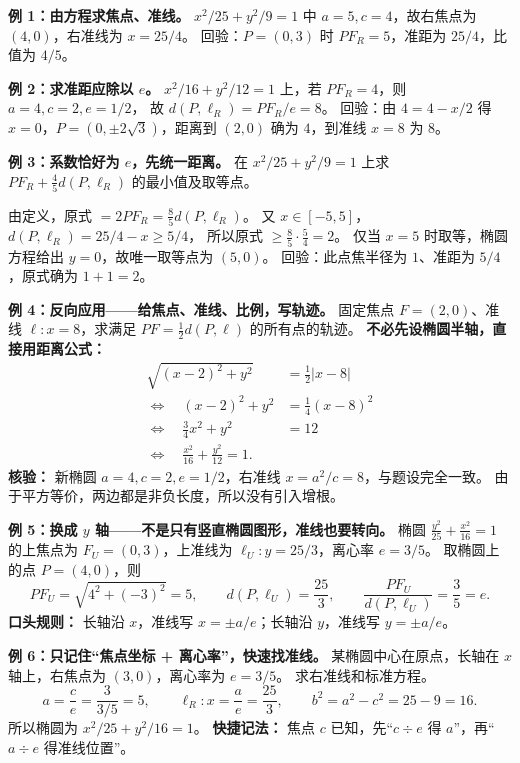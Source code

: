 \begin{examplebox}
\textbf{例 1：由方程求焦点、准线。}
$x^2/25+y^2/9=1$ 中 $a=5,c=4$，故右焦点为 $\boxed{(4,0)}$，右准线为 $\boxed{x=25/4}$。
回验：$P=(0,3)$ 时 $PF_R=5$，准距为 $25/4$，比值为 $4/5$。

\medskip
\textbf{例 2：求准距应除以 $e$。}
$x^2/16+y^2/12=1$ 上，若 $PF_R=4$，则 $a=4,c=2,e=1/2$，
故 $d(P,\ell_R)=PF_R/e=\boxed{8}$。
回验：由 $4=4-x/2$ 得 $x=0$，$P=(0,\pm2\sqrt3)$，距离到 $(2,0)$ 确为 $4$，到准线 $x=8$ 为 $8$。
\end{examplebox}
\clearpage
\begin{examplebox}
\textbf{例 3：系数恰好为 $e$，先统一距离。}
在 $x^2/25+y^2/9=1$ 上求 $PF_R+\tfrac45d(P,\ell_R)$ 的最小值及取等点。

由定义，原式 $=2PF_R=\tfrac85d(P,\ell_R)$。
又 $x\in[-5,5]$，$d(P,\ell_R)=25/4-x\ge5/4$，
所以原式 $\ge\tfrac85\cdot\tfrac54=\boxed{2}$。
仅当 $x=5$ 时取等，椭圆方程给出 $y=0$，故唯一取等点为 $\boxed{(5,0)}$。
回验：此点焦半径为 $1$、准距为 $5/4$，原式确为 $1+1=2$。
\end{examplebox}
\clearpage

\begin{examplebox}
\textbf{例 4：反向应用——给焦点、准线、比例，写轨迹。}
固定焦点 $F=(2,0)$、准线 $\ell:x=8$，求满足
$PF=\tfrac12 d(P,\ell)$ 的所有点的轨迹。
\textbf{不必先设椭圆半轴，直接用距离公式：}
\[
\begin{aligned}
\sqrt{(x-2)^2+y^2}&=\frac12|x-8|\\
\Longleftrightarrow\quad (x-2)^2+y^2&=\frac14(x-8)^2\\
\Longleftrightarrow\quad \frac34 x^2+y^2&=12\\
\Longleftrightarrow\quad \boxed{\frac{x^2}{16}+\frac{y^2}{12}=1}.
\end{aligned}
\]
\textbf{核验：} 新椭圆 $a=4,c=2,e=1/2$，右准线 $x=a^2/c=8$，与题设完全一致。
由于平方等价，两边都是非负长度，所以没有引入增根。
\end{examplebox}
\clearpage
\begin{examplebox}
\textbf{例 5：换成 $y$ 轴——不是只有竖直椭圆图形，准线也要转向。}
椭圆 $\frac{y^2}{25}+\frac{x^2}{16}=1$ 的上焦点为
$F_U=(0,3)$，上准线为 $\ell_U:y=25/3$，离心率 $e=3/5$。
取椭圆上的点 $P=(4,0)$，则
\[
PF_U=\sqrt{4^2+(-3)^2}=5,\qquad
 d(P,\ell_U)=\frac{25}{3},\qquad
 \frac{PF_U}{d(P,\ell_U)}=\frac35=e.
\]
\textbf{口头规则：} 长轴沿 $x$，准线写 $x=\pm a/e$；长轴沿 $y$，准线写 $y=\pm a/e$。
\end{examplebox}
\clearpage
\begin{examplebox}
\textbf{例 6：只记住“焦点坐标 + 离心率”，快速找准线。}
某椭圆中心在原点，长轴在 $x$ 轴上，右焦点为 $(3,0)$，离心率为 $e=3/5$。
求右准线和标准方程。
\[
a=\frac ce=\frac{3}{3/5}=5,\qquad
\boxed{\ell_R:x=\frac ae=\frac{25}{3}},\qquad
b^2=a^2-c^2=25-9=16.
\]
所以椭圆为 $\boxed{x^2/25+y^2/16=1}$。
\textbf{快捷记法：} 焦点 $c$ 已知，先“$c\div e$ 得 $a$”，再“$a\div e$ 得准线位置”。
\end{examplebox}
